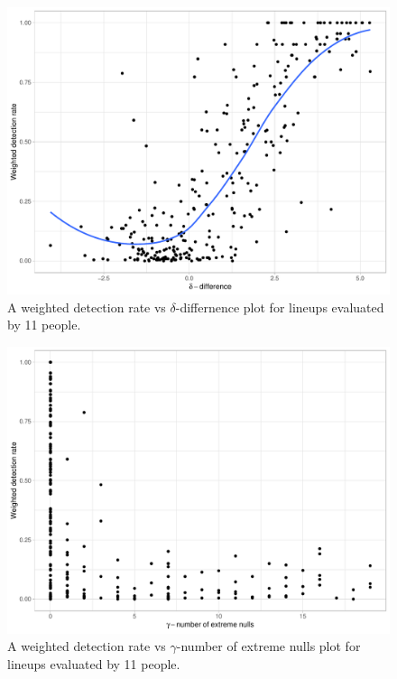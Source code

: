 \documentclass[]{interact}
\theoremstyle{plain}%
\theoremstyle{definition}
\theoremstyle{remark}
\begin{document}
\begin{figure}

{\centering \includegraphics[width=1\linewidth]{paper_files/figure-latex/unnamed-chunk-5-1} 

}

\caption{A weighted detection rate vs $\delta$-differnence plot for lineups evaluated by 11 people.}\label{fig:unnamed-chunk-5}
\end{figure}

\begin{figure}

{\centering \includegraphics[width=1\linewidth]{paper_files/figure-latex/unnamed-chunk-6-1} 

}

\caption{A weighted detection rate vs $\gamma$-number of extreme nulls plot for lineups evaluated by 11 people.}\label{fig:unnamed-chunk-6}
\end{figure}
\end{document}
